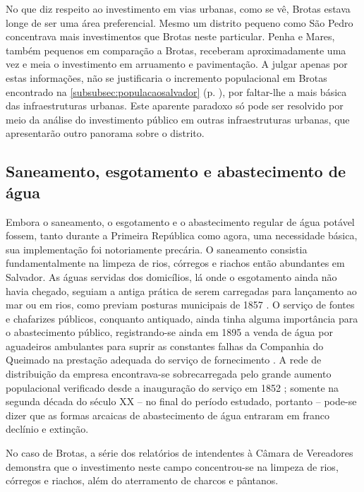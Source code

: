 No que diz respeito ao investimento em vias urbanas, como se vê, Brotas estava longe de ser uma área preferencial. Mesmo um distrito pequeno como São Pedro concentrava mais investimentos que Brotas neste particular. Penha e Mares, também pequenos em comparação a Brotas, receberam aproximadamente uma vez e meia o investimento em arruamento e pavimentação. A julgar apenas por estas informações, não se justificaria o incremento populacional em Brotas encontrado na \autoref{subsubsec:populacaosalvador} (p. \pageref{subsubsec:populacaosalvador}), por faltar-lhe a mais básica das infraestruturas urbanas. Este aparente paradoxo só pode ser resolvido por meio da análise do investimento público em outras infraestruturas urbanas, que apresentarão outro panorama sobre o distrito.

\subsection{Saneamento, esgotamento e abastecimento de água}

Embora o saneamento, o esgotamento e o abastecimento regular de água potável fossem, tanto durante a Primeira República como agora, uma necessidade básica, sua implementação foi notoriamente precária.  O saneamento consistia fundamentalmente na limpeza de rios, córregos e riachos então abundantes em Salvador. As águas servidas dos domicílios, lá onde o esgotamento ainda não havia chegado, seguiam a antiga prática de serem carregadas para lançamento ao mar ou em rios, como previam posturas municipais de 1857 \cite[p.~118]{SAMPAIO2005}. O serviço de fontes e chafarizes públicos, conquanto antiquado, ainda tinha alguma importância para o abastecimento público, registrando-se ainda em 1895 a venda de água por aguadeiros ambulantes para suprir as constantes falhas da Companhia do Queimado na prestação adequada do serviço de fornecimento \cite[p.~129]{SAMPAIO2005}. A rede de distribuição da empresa encontrava-se sobrecarregada pelo grande aumento populacional verificado desde a inauguração do serviço em 1852 \cite[p.~273]{santos_theodoro_2010}; somente na segunda década do século XX -- no final do período estudado, portanto -- pode-se dizer que as formas arcaicas de abastecimento de água entraram em franco declínio e extinção. 

No caso de Brotas, a série dos relatórios de intendentes à Câmara de Vereadores demonstra que o investimento neste campo concentrou-se na limpeza de rios, córregos e riachos, além do aterramento de charcos e pântanos.

